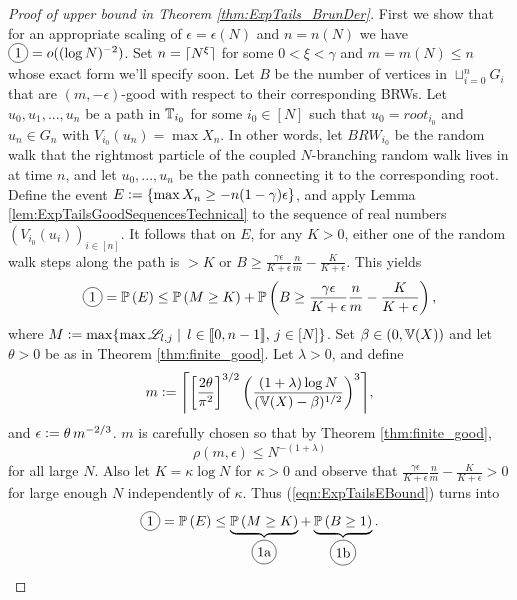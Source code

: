 \begin{proof}[Proof of upper bound in Theorem \ref{thm:ExpTails_BrunDer}]
First we show that for an appropriate scaling of $\epsilon=\epsilon(N)$ and $n = n(N)$ we have $\circled{1} = o((\log N)^{-2})$. Set $n = \lceil N^\xi\rceil$ for some $0 < \xi < \gamma$ and $m = m(N) \leq n$ whose exact form we'll specify soon. Let $B$ be the number of vertices in $\sqcup_{i=0}^n G_i$ that are $(m, - \epsilon)$-good with respect to their corresponding BRWs. Let $u_0, u_1, ..., u_n$ be a path in $\mathbb{T}_{i_0}$ for some $i_0 \in [N]$ such that $u_0 = root_{i_0}$ and $u_n \in G_n$ with $V_{i_0}(u_n) = \max X_n$. In other words, let $BRW_{i_0}$ be the random walk that the rightmost particle of the coupled $N$-branching random walk lives in at time $n$, and let $u_0, ..., u_n$ be the path connecting it to the corresponding root. Define the event $E \vcentcolon= \{ \max X_n \geq - n (1 - \gamma)\epsilon \}$, and apply Lemma \ref{lem:ExpTailsGoodSequencesTechnical} to the sequence of real numbers $(V_{i_0}(u_i))_{i \in [n]}$. It follows that on $E$, for any $K > 0$, either one of the random walk steps along the path is $> K$ or $B \geq \frac{\gamma\epsilon}{K + \epsilon}\frac{n}{m} - \frac{K}{K + \epsilon}$. This yields
\begin{equation}\label{eqn:ExpTailsEBound}
\circled{1} = \Pr{E} \leq \Pr{M \geq K} + \Pr{B \geq \frac{\gamma\epsilon}{K + \epsilon}\frac{n}{m} - \frac{K}{K + \epsilon}},  
\end{equation}
where $M \vcentcolon= \max \{\max \mathscr{L}_{l, j} \mid\, l \in \llbracket0, n - 1\rrbracket,\, j \in [N]\}$. Set $\beta \in (0, \mathbb{V}(X))$ and let $\theta > 0$ be as in Theorem \ref{thm:finite_good}. Let $\lambda > 0$, and define 
\begin{equation}\nonumber
m \defeq \ceil*{ \left[\frac{2 \theta}{\pi^2}\right]^{3/2} \left( \frac{(1 + \lambda) \log N}{(\bb{V}(X) - \beta)^{1/2}}\right)^3},
\end{equation} 
and $\epsilon \vcentcolon= \theta\, m^{-2/3}$. $m$ is carefully chosen so that by Theorem \ref{thm:finite_good}, 
\begin{equation}\label{eqn:ExpTailsProof}
\rho(m, \epsilon) \leq N^{-(1 + \lambda)} 
\end{equation}
for all large $N$. Also let $K = \kappa \log N$ for $\kappa > 0$ and observe that $\frac{\gamma\epsilon}{K + \epsilon}\frac{n}{m} - \frac{K}{K + \epsilon} > 0$ for large enough $N$ independently of $\kappa$. Thus (\ref{eqn:ExpTailsEBound}) turns into
\begin{equation}\nonumber
\circled{1} = \Pr{E} \leq \underbrace{\Pr{M \geq K}}_{\circled{1a}} + \underbrace{\Pr{B \geq 1}}_{\circled{1b}}. 
\end{equation}


\end{proof}
